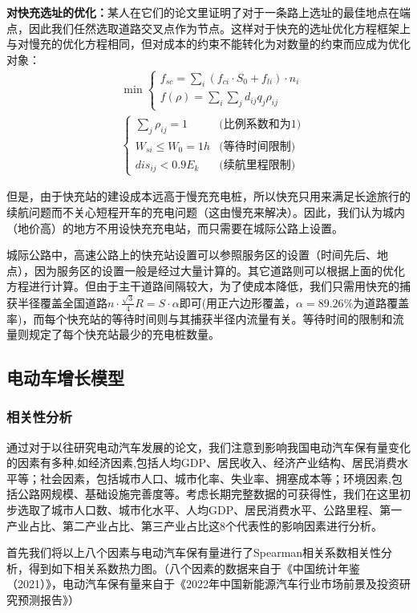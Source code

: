 \documentclass[12pt, a4paper, oneside]{ctexart}
\begin{document}
\textbf{对快充选址的优化：}某人在它们的论文里证明了对于一条路上选址的最佳地点在端点，因此我们任然选取道路交叉点作为节点。这样对于快充的选址优化方程框架上与对慢充的优化方程相同，但对成本的约束不能转化为对数量的约束而应成为优化对象：
\begin{align*}
    & \min  \begin{cases}
        f_{sc}=\sum\limits_{i}(f_{ci}\cdot S_0+f_{li})\cdot n_i\\
        f(\rho)=\sum_i \sum_jd_{ij} q_j \rho_{ij}
    \end{cases} \\
    & \begin{cases}
       \sum\limits_j \rho_{ij}=1    & \text{(比例系数和为1)} \\
       W_{si}\leqslant W_0=1h & \text{(等待时间限制)}\\
       dis_{ij}<0.9E_k&\text{(续航里程限制)}
   \end{cases}
\end{align*}

但是，由于快充站的建设成本远高于慢充充电桩，所以快充只用来满足长途旅行的续航问题而不关心短程开车的充电问题（这由慢充来解决）。因此，我们认为城内（地价高）的地方不用设快充充电站，而只需要在城际公路上设置。

城际公路中，高速公路上的快充站设置可以参照服务区的设置（时间先后、地点），因为服务区的设置一般是经过大量计算的。其它道路则可以根据上面的优化方程进行计算。但由于主干道路间隔较大，为了使成本降低，我们只需用快充的捕获半径覆盖全国道路\(n\cdot \frac{\sqrt3}{4}R = S\cdot \alpha\)即可(用正六边形覆盖，\(\alpha=89.26\%\)为道路覆盖率)，而每个快充站的等待时间则与其捕获半径内流量有关。等待时间的限制和流量则规定了每个快充站最少的充电桩数量。
\subsection{电动车增长模型}
\subsubsection{相关性分析}
通过对于以往研究电动汽车发展的论文，我们注意到影响我国电动汽车保有量变化的因素有多种,如经济因素,包括人均GDP、居民收入、经济产业结构、居民消费水平等；社会因素，包括城市人口、城市化率、失业率、拥塞成本等；环境因素,包括公路网规模、基础设施完善度等。考虑长期完整数据的可获得性，我们在这里初步选取了城市人口数、城市化水平、人均GDP、居民消费水平、公路里程、第一产业占比、第二产业占比、第三产业占比这8个代表性的影响因素进行分析。

首先我们将以上八个因素与电动汽车保有量进行了Spearman相关系数相关性分析，得到如下相关系数热力图。（八个因素的数据来自于《中国统计年鉴（2021）》\cite{cite:统计年鉴}，电动汽车保有量来自于《2022年中国新能源汽车行业市场前景及投资研究预测报告》\cite{cite:预测报告}）
\end{document}
